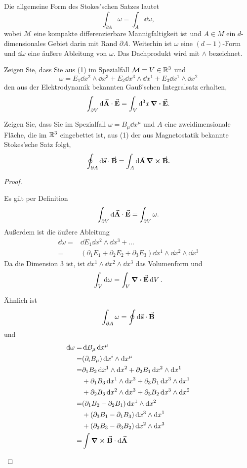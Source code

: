 \begin{Problem}
Die allgemeine Form des Stokes’schen Satzes lautet
\[
\int_{\partial A}\omega = \int_A \dd{\omega}
,\]
wobei $\mathcal{M}$ eine kompakte differenzierbare Mannigfaltigkeit ist und $A\in M$ ein $d$-dimensionales Gebiet darin mit Rand $\partial A$. Weiterhin ist $\omega$ eine $(d-1)$-Form und $\dd{\omega}$ eine äußere Ableitung von $\omega$. Das Dachprodukt wird mit $\wedge$ bezeichnet.
\begin{parts}
\item Zeigen Sie, dass Sie aus (1) im Spezialfall $\mathcal{M}=V\in \mathbb{R}^3$ und
	\[
	\omega=E_1\dd{x}^2\wedge\dd{x}^3+E_2\dd{x}^3\wedge\dd{x}^1+E_3\dd{x}^1\wedge\dd{x}^2
	\]
	den aus der Elektrodynamik bekannten Gauß'schen Integralsatz erhalten,
	\[
	\int_{\partial V}\dd{\va A}\cdot\va E = \int_V \dd[3]{x} \div{\va E}
	.\] 
\item Zeigen Sie, dass Sie im Spezialfall $\omega=B_\mu\dd{x^\mu}$ und $A$ eine zweidimensionale Fläche, die im $\mathbb{R}^3$ eingebettet ist, aus (1) der aus Magnetostatik bekannte Stokes'sche Satz folgt,
	\[
	\oint_{\partial A}\dd{\va s}\cdot\va B=\int_A \dd{\va A}\curl{\va B}
	.\] 
\end{parts}
\end{Problem}
\begin{proof}
	\begin{parts}
	\item Es gilt per Definition
		\[
		\int_{\partial V}\dd{\va A}\cdot\va E=\int_{\partial V}\omega
		.\] 
		Außerdem ist die äußere Ableitung
		\begin{align*}
			\dd{\omega}=& \dd{E_1}\dd{x^2}\wedge\dd{x^3}+\dots \\
			=& (\partial_1E_1+\partial_2E_2+\partial_3E_3)\dd{x^1}\wedge\dd{x^2}\wedge\dd{x^3}
		\end{align*}
		Da die Dimension $3$ ist, ist $\dd{x^1}\wedge\dd{x^2}\wedge\dd{x^3}$ das Volumenform und
		\[
		\int_V \dd{\omega}=\int_V \div{\va E}\dd{V}
		.\] 
	\item Ähnlich ist
		\[
		\int_{\partial A}\omega=\oint\dd{\va s}\cdot \va B
		\]
		und
		\begin{align*}
			\dd{\omega}=&\dd{B_\mu}\dd{x^\mu}\\
			=& (\partial_i B_\mu)\dd{x^i}\wedge\dd{x^\mu}\\
			=&\partial_1 B_2 \dd{x^1}\wedge\dd{x^2}+\partial_2 B_1 \dd{x^2}\wedge\dd{x^1}\\
			&+\partial_1 B_3\dd{x^1}\wedge\dd{x^3} +\partial_3 B_1\dd{x^3}\wedge\dd{x^1}\\
			&+\partial_2B_3 \dd{x^2}\wedge\dd{x^3}+\partial_3 B_2\dd{x^3}\wedge\dd{x^2}\\
			=&(\partial_1 B_2-\partial_2 B_1)\dd{x^1}\wedge \dd{x^2}\\
			&+(\partial_3B_1-\partial_1 B_3)\dd{x^3}\wedge\dd{x^1}\\
			&+(\partial_2B_3-\partial_3B_2)\dd{x^2}\wedge\dd{x^3}\\
			=&\int \curl{\va B}\cdot \dd{\va A}
		\end{align*}
	\end{parts}
\end{proof}


